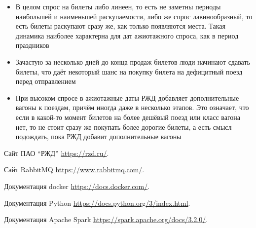 \documentclass[conference]{IEEEtran}
\begin{document}
\begin{itemize}
	\item В целом спрос на билеты либо линеен, то есть не заметны периоды наибольшей и наименьшей раскупаемости, либо же спрос лавинообразный, то есть билеты раскупают сразу же, как только появляются места. Такая динамика наиболее характерна для дат ажиотажного спроса, как в период праздников
	
	\item Зачастую за несколько дней до конца продаж билетов люди начинают сдавать билеты, что даёт некоторый шанс на покупку билета на дефицитный поезд перед отправлением
	
	\item При высоком спросе в ажиотажные даты РЖД добавляет дополнительные вагоны к поездам, причём иногда даже в несколько этапов. Это означает, что если в какой-то момент билетов на более дешёвый поезд или класс вагона нет, то не стоит сразу же покупать более дорогие билеты, а есть смысл подождать, пока РЖД добавит дополнительные вагоны
\end{itemize}

\begin{thebibliography}{00}
 Сайт ПАО ``РЖД'' \href{https://rzd.ru}{https://rzd.ru/}.

 Сайт RabbitMQ \href{https://www.rabbitmq.com/}{https://www.rabbitmq.com/}.

 Документация docker \href{https://docs.docker.com/}{https://docs.docker.com/}.

 Документация Python \href{https://docs.python.org/3/index.html}{https://docs.python.org/3/index.html}.

 Документация Apache Spark \href{https://spark.apache.org/docs/3.2.0/}{https://spark.apache.org/docs/3.2.0/}.
\end{thebibliography}
\end{document}

